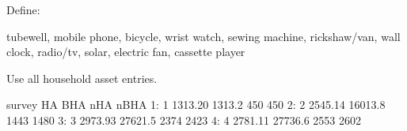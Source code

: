 Define:
\begin{description}
\vspace{1.0ex}\setlength{\itemsep}{1.0ex}\setlength{\baselineskip}{12pt}
\item[NLHAssets]	tubewell, mobile phone, bicycle, wrist watch, sewing machine, rickshaw/van, wall clock, radio/tv, solar, electric fan, cassette player
\item[BroadNLHAssets]	Use all household asset entries.
\end{description} 
\begin{Schunk}
\begin{Soutput}
   survey      HA     BHA  nHA nBHA
1:      1 1313.20  1313.2  450  450
2:      2 2545.14 16013.8 1443 1480
3:      3 2973.93 27621.5 2374 2423
4:      4 2781.11 27736.6 2553 2602
\end{Soutput}
\end{Schunk}


